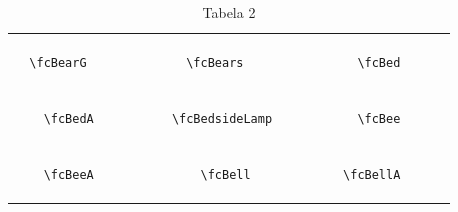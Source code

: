 \documentclass[x11names]{article}
\begin{document}
\begin{table}[H]
\begin{tabular}{|c|c|c|c|c|c|}
		&\multirow{5}{*}{	\fcBearG	[scale=0.16]} & &\multirow{5}{*}{	\fcBears	[scale=0.16]} & &\multirow{5}{*}{	\fcBed	[scale=0.09]}\\	& & & & & \\	& & & & & \\	\verb|	\fcBearG	| & & \verb|	\fcBears	| & & \verb|	\fcBed	| & \\	& & & & & \\	& & & & & \\	& & & & & \\	\hline									
		&\multirow{5}{*}{	\fcBedA	[scale=0.16]} & &\multirow{5}{*}{	\fcBedsideLamp	[scale=0.16]} & &\multirow{5}{*}{	\fcBee	[scale=0.64]}\\	& & & & & \\	& & & & & \\	\verb|	\fcBedA	| & & \verb|	\fcBedsideLamp	| & & \verb|	\fcBee	| & \\	& & & & & \\	& & & & & \\	& & & & & \\	\hline									
		&\multirow{5}{*}{	\fcBeeA	[scale=0.64]} & &\multirow{5}{*}{	\fcBell	[scale=0.64]} & &\multirow{5}{*}{	\fcBellA	[scale=0.64]}\\	& & & & & \\	& & & & & \\	\verb|	\fcBeeA	| & & \verb|	\fcBell	| & & \verb|	\fcBellA	| & \\	& & & & & \\	& & & & & \\	& & & & & \\		\hline 	\hline 	\end{tabular}	\caption{	Tabela 2	}\label{	Tab2	}\end{table}
\end{document}
